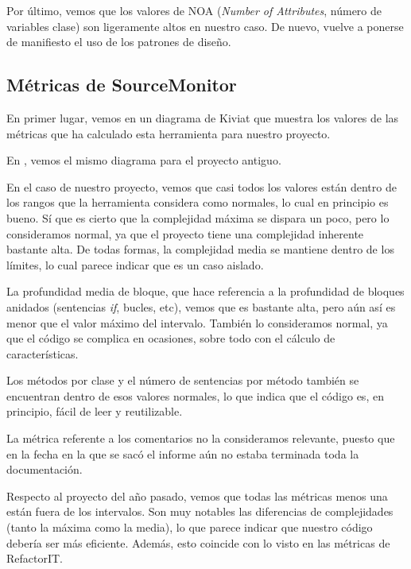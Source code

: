 Por último, vemos que los valores de NOA (\textit{Number of Attributes}, número de variables clase) son ligeramente altos en nuestro caso. De nuevo, vuelve a ponerse de manifiesto el uso de los patrones de diseño.

\subsection{Métricas de SourceMonitor}
En primer lugar, vemos en  un diagrama de Kiviat que muestra los valores de las métricas que ha calculado esta herramienta para nuestro proyecto.


En , vemos el mismo diagrama para el proyecto antiguo.


En el caso de nuestro proyecto, vemos que casi todos los valores están dentro de los rangos que la herramienta considera como normales, lo cual en principio es bueno. Sí que es cierto que la complejidad máxima se dispara un poco, pero lo consideramos normal, ya que el proyecto tiene una complejidad inherente bastante alta. De todas formas, la complejidad media se mantiene dentro de los límites, lo cual parece indicar que es un caso aislado.

La profundidad media de bloque, que hace referencia a la profundidad de bloques anidados (sentencias \textit{if}, bucles, etc), vemos que es bastante alta, pero aún así es menor que el valor máximo del intervalo. También lo consideramos normal, ya que el código se complica en ocasiones, sobre todo con el cálculo de características.

Los métodos por clase y el número de sentencias por método también se encuentran dentro de esos valores normales, lo que indica que el código es, en principio, fácil de leer y reutilizable.

La métrica referente a los comentarios no la consideramos relevante, puesto que en la fecha en la que se sacó el informe aún no estaba terminada toda la documentación.

Respecto al proyecto del año pasado, vemos que todas las métricas menos una están fuera de los intervalos. Son muy notables las diferencias de complejidades (tanto la máxima como la media), lo que parece indicar que nuestro código debería ser más eficiente. Además, esto coincide con lo visto en las métricas de RefactorIT.

